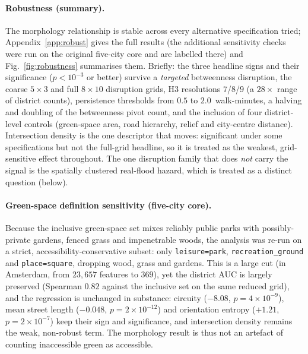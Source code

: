 \documentclass[sn-mathphys-num,pdflatex]{sn-jnl}
\begin{document}
\paragraph{Robustness (summary).} The morphology relationship is stable across every
alternative specification tried; Appendix~\ref{app:robust} gives the full results
(the additional sensitivity checks were run on the original five-city core and are
labelled there) and Fig.~\ref{fig:robustness} summarises them. Briefly: the three
headline signs and
their significance ($p<10^{-3}$ or better) survive a \emph{targeted} betweenness
disruption, the coarse $5\times3$ and full
$8\times10$ disruption grids, H3 resolutions $7$/$8$/$9$ (a $28\times$ range of
district counts), persistence thresholds from $0.5$ to $2.0$~walk-minutes, a halving
and doubling of the betweenness pivot count, and the inclusion of four
district-level controls (green-space area, road hierarchy, relief and city-centre
distance). Intersection density is the one descriptor that moves: significant under
some specifications but not the full-grid headline, so it is treated as the weakest,
grid-sensitive effect throughout. The one disruption family that does \emph{not}
carry the signal is the spatially clustered real-flood hazard, which is treated as a
distinct question (below).

\paragraph{Green-space definition sensitivity (five-city core).} Because the inclusive green-space set
mixes reliably public parks with possibly-private gardens, fenced grass and
impenetrable woods, the analysis was re-run on a strict, accessibility-conservative
subset: only \texttt{leisure=park}, \texttt{recreation\_ground} and
\texttt{place=square}, dropping wood, grass and gardens. This is a large cut (in
Amsterdam, from $23{,}657$ features to $369$), yet the district AUC is largely
preserved (Spearman $0.82$ against the inclusive set on the same reduced grid), and
the regression is unchanged in substance: circuity ($-8.08$, $p=4\times10^{-9}$),
mean street length ($-0.048$, $p=2\times10^{-12}$) and orientation entropy ($+1.21$,
$p=2\times10^{-7}$) keep their sign and significance, and intersection density
remains the weak, non-robust term. The morphology result is thus not an artefact of
counting inaccessible green as accessible.
\end{document}

